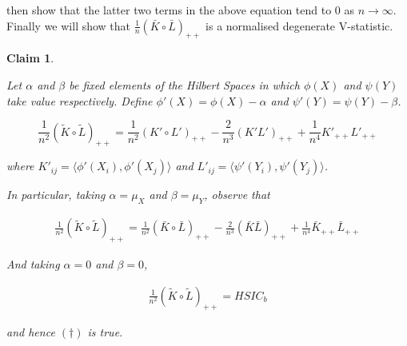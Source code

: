 \documentclass[12pt]{article}
\newtheorem{claim}{Claim}
\numberwithin{claim}{section}
\numberwithin{lemma}{section}
\numberwithin{theorem}{section}
\begin{document}
then show that the latter two terms in the above equation tend to 0 as $n \longrightarrow \infty$. Finally we will show that $\frac{1}{n}(\bar{K}\circ \bar{L})_{++}$ is a normalised degenerate V-statistic.

\begin{claim}\label{claim:HSICinvariant}

Let $\alpha$ and $\beta$ be fixed elements of the Hilbert Spaces in which $\phi(X)$ and $\psi(Y)$ take value respectively. Define $\phi'(X) = \phi(X) - \alpha$ and $\psi'(Y) = \psi(Y) - \beta$.

\[\frac{1}{n^2}(\tilde{K}\circ\tilde{L})_{++} = \frac{1}{n^2}(K'\circ L')_{++} - \frac{2}{n^3}(K'L')_{++} + \frac{1}{n^4}K'_{++}L'_{++}\]

where $K'_{ij} = \langle \phi'(X_i), \phi'(X_j) \rangle$ and $L'_{ij} = \langle \psi'(Y_i), \psi'(Y_j) \rangle$. 


In particular, taking $\alpha = \mu_X$ and $\beta  = \mu_Y$, observe that

\begin{align*}
\frac{1}{n^2} (\tilde{K}\circ \tilde{L})_{++} = \frac{1}{n^2}(\bar{K}\circ \bar{L})_{++} - \frac{2}{n^3}(\bar{K}\bar{L})_{++} + \frac{1}{n^4}\bar{K}_{++}\bar{L}_{++}
\end{align*}

And taking $\alpha = 0$ and $\beta = 0$,

\begin{align*}
\frac{1}{n^2} (\tilde{K}\circ \tilde{L})_{++} = HSIC_b
\end{align*}

and hence $(\dagger)$ is true.

\end{claim}
\end{document}

